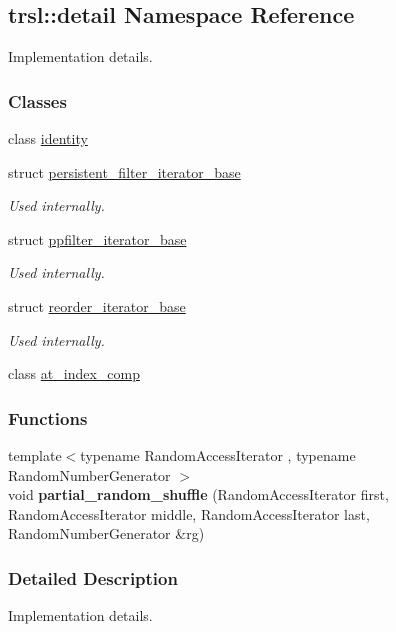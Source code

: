 \hypertarget{namespacetrsl_1_1detail}{
\subsection{trsl::detail Namespace Reference}
\label{namespacetrsl_1_1detail}
}


Implementation details.  
\subsubsection*{Classes}
\begin{DoxyCompactItemize}
\item 
class \hyperlink{classtrsl_1_1detail_1_1identity}{identity}
\item 
struct \hyperlink{structtrsl_1_1detail_1_1persistent__filter__iterator__base}{persistent\_\-filter\_\-iterator\_\-base}
\begin{DoxyCompactList}\small\item\em Used internally. \item\end{DoxyCompactList}\item 
struct \hyperlink{structtrsl_1_1detail_1_1ppfilter__iterator__base}{ppfilter\_\-iterator\_\-base}
\begin{DoxyCompactList}\small\item\em Used internally. \item\end{DoxyCompactList}\item 
struct \hyperlink{structtrsl_1_1detail_1_1reorder__iterator__base}{reorder\_\-iterator\_\-base}
\begin{DoxyCompactList}\small\item\em Used internally. \item\end{DoxyCompactList}\item 
class \hyperlink{classtrsl_1_1detail_1_1at__index__comp}{at\_\-index\_\-comp}
\end{DoxyCompactItemize}
\subsubsection*{Functions}
\begin{DoxyCompactItemize}
\item 
\hypertarget{namespacetrsl_1_1detail_a1a6c8c7485debc15ca6547d8e1e9ced9}{
{\footnotesize template$<$typename RandomAccessIterator , typename RandomNumberGenerator $>$ }\\void {\bfseries partial\_\-random\_\-shuffle} (RandomAccessIterator first, RandomAccessIterator middle, RandomAccessIterator last, RandomNumberGenerator \&rg)}
\label{namespacetrsl_1_1detail_a1a6c8c7485debc15ca6547d8e1e9ced9}

\end{DoxyCompactItemize}


\subsubsection{Detailed Description}
Implementation details. 